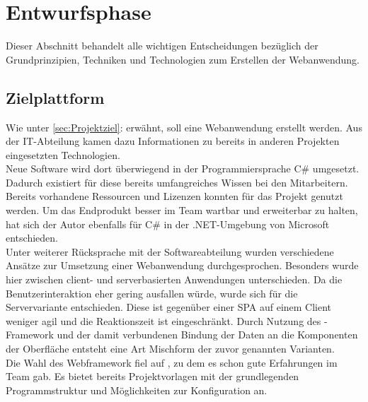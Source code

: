 \section{Entwurfsphase} 
\label{sec:Entwurfsphase}
Dieser Abschnitt behandelt alle wichtigen Entscheidungen bezüglich der Grundprinzipien, Techniken und Technologien zum
Erstellen der Webanwendung.

\subsection{Zielplattform}
\label{sec:Zielplattform}
Wie unter \ref{sec:Projektziel}:  erwähnt, soll eine
Webanwendung erstellt werden. Aus der IT-Abteilung kamen dazu Informationen zu bereits 
in anderen Projekten eingesetzten Technologien.\\
Neue Software wird dort überwiegend in der Programmiersprache C\# umgesetzt. 
Dadurch existiert für diese bereits umfangreiches Wissen bei den Mitarbeitern.
Bereits vorhandene Ressourcen und Lizenzen konnten für das Projekt genutzt werden.
Um das Endprodukt besser im Team wartbar und erweiterbar zu halten, hat sich der Autor 
ebenfalls für C\# in der .NET-Umgebung von Microsoft entschieden.\\
Unter weiterer Rücksprache mit der Softwareabteilung wurden verschiedene Ansätze zur
Umsetzung einer Webanwendung durchgesprochen. Besonders wurde hier zwischen client- und serverbasierten
Anwendungen unterschieden. Da die Benutzerinteraktion eher gering ausfallen würde, wurde sich
für die Servervariante entschieden. Diese ist gegenüber einer \ac{SPA} auf einem Client weniger agil und die 
Reaktionszeit ist eingeschränkt. Durch Nutzung des -Framework und der damit
verbundenen Bindung der Daten an die Komponenten der Oberfläche entsteht eine Art Mischform der zuvor genannten Varianten.\\
Die Wahl des Webframework fiel auf , zu dem es schon gute Erfahrungen im Team gab.
Es bietet bereits Projektvorlagen mit der grundlegenden Programmstruktur und Möglichkeiten zur
Konfiguration an. 

